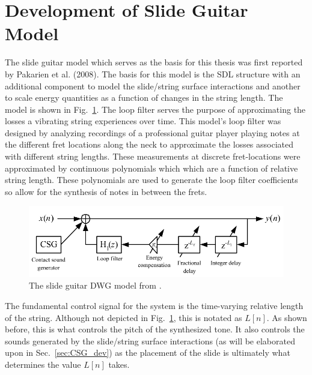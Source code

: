 \documentclass[main.tex]{subfiles}
\begin{document}
\section{Development of Slide Guitar Model}
The slide guitar model which serves as the basis for this thesis was first reported by Pakarien et al. (2008). The basis for this model is the SDL structure with an additional component to model the slide/string surface interactions and another to scale energy quantities as a function of changes in the string length. The model is shown in Fig.~\ref{fig:original_DWG}. The loop filter serves the purpose of approximating the losses a vibrating string experiences over time. This model's loop filter was designed by analyzing recordings of a professional guitar player playing notes at the different fret locations along the neck to approximate the losses associated with different string lengths. These measurements at discrete fret-locations were approximated by continuous polynomials which which are a function of relative string length. These polynomials are used to generate the loop filter coefficients so allow for the synthesis of notes in between the frets.

\begin{figure}[h]
    \centering
    \includegraphics[scale=.75]{./images/pictures/SDL_slide_model.png}
    \caption{The slide guitar DWG model from .}
    \label{fig:original_DWG}
\end{figure}

The fundamental control signal for the system is the time-varying relative length of the string. Although not depicted in Fig.~\ref{fig:original_DWG}, this is notated as $L[n]$. As shown before, this is what controls the pitch of the synthesized tone. It also controls the sounds generated by the slide/string surface interactions (as will be elaborated upon in Sec.~\ref{sec:CSG_dev}) as the placement of the slide is ultimately what determines the value $L[n]$ takes.
\end{document}
